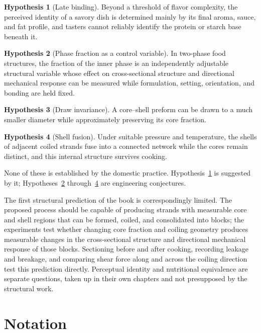 \documentclass[11pt,openany]{book}
\theoremstyle{definition}
\newtheorem{hypothesis}{Hypothesis}
\begin{document}
\begin{hypothesis}[Late binding]\label{h:late}
Beyond a threshold of flavor complexity, the perceived identity of a savory dish is determined mainly by its final aroma, sauce, and fat profile, and tasters cannot reliably identify the protein or starch base beneath it.
\end{hypothesis}

\begin{hypothesis}[Phase fraction as a control variable]\label{h:phase}
In two-phase food structures, the fraction of the inner phase is an independently adjustable structural variable whose effect on cross-sectional structure and directional mechanical response can be measured while formulation, setting, orientation, and bonding are held fixed.
\end{hypothesis}

\begin{hypothesis}[Draw invariance]\label{h:draw}
A core--shell preform can be drawn to a much smaller diameter while approximately preserving its core fraction.
\end{hypothesis}

\begin{hypothesis}[Shell fusion]\label{h:fusion}
Under suitable pressure and temperature, the shells of adjacent coiled strands fuse into a connected network while the cores remain distinct, and this internal structure survives cooking.
\end{hypothesis}

None of these is established by the domestic practice. Hypothesis~\ref{h:late} is suggested by it; Hypotheses~\ref{h:phase} through~\ref{h:fusion} are engineering conjectures.

The first structural prediction of the book is correspondingly limited. The proposed process should be capable of producing strands with measurable core and shell regions that can be formed, coiled, and consolidated into blocks; the experiments test whether changing core fraction and coiling geometry produces measurable changes in the cross-sectional structure and directional mechanical response of those blocks. Sectioning before and after cooking, recording leakage and breakage, and comparing shear force along and across the coiling direction test this prediction directly. Perceptual identity and nutritional equivalence are separate questions, taken up in their own chapters and not presupposed by the structural work.

\chapter*{Notation}
\end{document}
